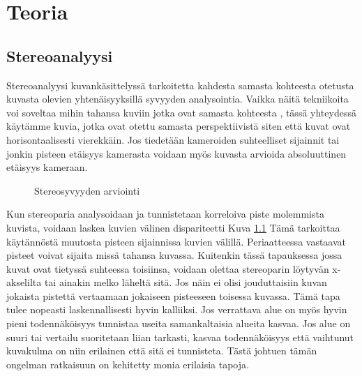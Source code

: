 \chapter{Teoria}%
\label{ch:teoria}

\section{Stereoanalyysi}

Stereoanalyysi kuvankäsittelyssä tarkoitetta kahdesta samasta kohteesta otetusta kuvasta olevien yhtenäisyyksillä syvyyden analysointia.
Vaikka näitä tekniikoita voi soveltaa mihin tahansa kuviin jotka ovat samasta kohteesta \cite{SumiYasushi20023ORi},
tässä yhteydessä käytämme kuvia,
jotka ovat otettu samasta perspektiivistä siten että kuvat ovat horisontaalisesti vierekkäin.
Jos tiedetään kameroiden suhteelliset sijainnit tai jonkin pisteen etäisyys kamerasta voidaan myös kuvasta arvioida absoluuttinen etäisyys kameraan. 

\begin{figure}[h]
\centering
{}
\caption{Stereosyvyyden arviointi}
\label{fig:stereo}
\end{figure}
    
Kun stereoparia analysoidaan ja tunnistetaan korreloiva piste molemmista kuvista,
voidaan laskea kuvien välinen dispariteetti Kuva \ref{fig:stereo}
Tämä tarkoittaa käytännöstä muutosta pisteen sijainnissa kuvien välillä.
Periaatteessa vastaavat pisteet voivat sijaita missä tahansa kuvassa.
Kuitenkin tässä tapauksessa jossa kuvat ovat tietyssä suhteessa toisiinsa,
voidaan olettaa stereoparin löytyvän x-akselilta tai ainakin melko läheltä sitä.
Jos näin ei olisi jouduttaisiin kuvan jokaista pistettä vertaamaan jokaiseen pisteeseen toisessa kuvassa.
Tämä tapa tulee nopeasti laskennallisesti hyvin kalliiksi.
Jos verrattava alue on myös hyvin pieni todennäköisyys tunnistaa useita samankaltaisia alueita kasvaa.
Jos alue on suuri tai vertailu suoritetaan liian tarkasti,
kasvaa todennäköisyys että vaihtunut kuvakulma on niin erilainen että sitä ei tunnisteta.
Tästä johtuen tämän ongelman ratkaisuun on kehitetty monia erilaisia tapoja.


